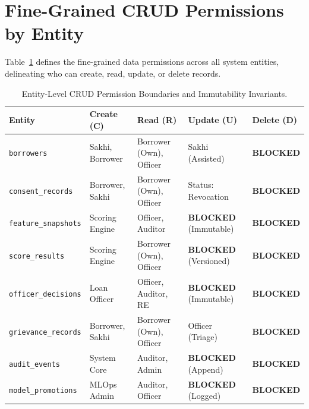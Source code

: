 \section{Fine-Grained CRUD Permissions by Entity}
Table~\ref{tab:crud_matrix} defines the fine-grained data permissions across all system entities, delineating who can create, read, update, or delete records.

\begin{table}[H]
\centering
\small
\renewcommand{\arraystretch}{1.2}
\begin{tabularx}{\textwidth}{l p{2.8cm} p{3.2cm} p{2.8cm} p{2.2cm}}
  \toprule
  \textbf{Entity} & \textbf{Create (C)} & \textbf{Read (R)} & \textbf{Update (U)} & \textbf{Delete (D)} \\
  \midrule
  \texttt{borrowers} & Sakhi, Borrower & Borrower (Own), Officer & Sakhi (Assisted) & \textbf{BLOCKED} \\
  \texttt{consent\_records} & Borrower, Sakhi & Borrower (Own), Officer & Status: Revocation & \textbf{BLOCKED} \\
  \texttt{feature\_snapshots}& Scoring Engine & Officer, Auditor & \textbf{BLOCKED} (Immutable) & \textbf{BLOCKED} \\
  \texttt{score\_results} & Scoring Engine & Borrower (Own), Officer & \textbf{BLOCKED} (Versioned) & \textbf{BLOCKED} \\
  \texttt{officer\_decisions} & Loan Officer & Officer, Auditor, RE & \textbf{BLOCKED} (Immutable) & \textbf{BLOCKED} \\
  \texttt{grievance\_records}& Borrower, Sakhi & Borrower (Own), Officer & Officer (Triage) & \textbf{BLOCKED} \\
  \texttt{audit\_events} & System Core & Auditor, Admin & \textbf{BLOCKED} (Append) & \textbf{BLOCKED} \\
  \texttt{model\_promotions}& MLOps Admin & Auditor, Officer & \textbf{BLOCKED} (Logged) & \textbf{BLOCKED} \\
  \bottomrule
\end{tabularx}
\caption{Entity-Level CRUD Permission Boundaries and Immutability Invariants.}
\label{tab:crud_matrix}
\end{table}

